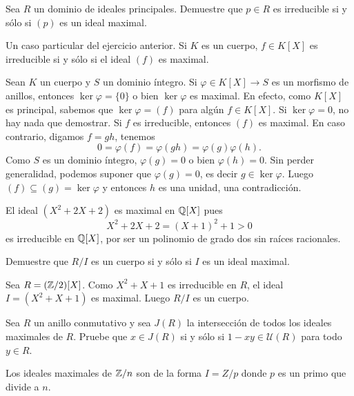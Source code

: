 \begin{exercise}
Sea $R$ un dominio de ideales principales. Demuestre que $p\in R$ es irreducible si y sólo si $(p)$ es un ideal maximal. 	
\end{exercise}

Un caso particular del ejercicio anterior. Si $K$ es un cuerpo, $f\in K[X]$ es irreducible si y sólo si el
ideal $(f)$ es maximal.  

\begin{example}
Sean $K$ un cuerpo y $S$ un dominio íntegro. Si $\varphi\in K[X]\to S$ es un morfismo de anillos, entonces $\ker \varphi=\{0\}$ o bien $\ker\varphi$ es maximal. En efecto,
como $K[X]$ es principal, sabemos que $\ker\varphi=(f)$ para algún $f\in K[X]$. Si $\ker\varphi=0$, no hay nada que demostrar. 
Si $f$ es irreducible, entonces $(f)$ es maximal. En caso contrario, 
digamos $f=gh$, tenemos 
\[
0=\varphi(f)=\varphi(gh)=\varphi(g)\varphi(h).
\]
Como $S$ es un dominio íntegro, $\varphi(g)=0$ o bien $\varphi(h)=0$. Sin perder generalidad, podemos suponer que $\varphi(g)=0$,
es decir $g\in\ker \varphi$. Luego $(f)\subseteq (g)=\ker\varphi$ y entonces $h$ es una unidad, una contradicción. 
\end{example}

\begin{example}
El ideal $(X^2+2X+2)$ es maximal en $\mathbb{Q}[X]$ pues 
\[
X^2+2X+2=(X+1)^2+1>0
\]
es irreducible en $\mathbb{Q}[X]$, por ser un polinomio de grado dos sin raíces racionales.  	
\end{example}

\begin{exercise}
Demuestre que $R/I$ es un cuerpo si y sólo si $I$ es un ideal maximal.	
\end{exercise}
	
\begin{example}
Sea $R=(\mathbb{Z}/2)[X]$. Como $X^2+X+1$ es irreducible en $R$, el ideal $I=(X^2+X+1)$ es maximal. Luego $R/I$ es un cuerpo.
\end{example}

\begin{exercise}
\label{xca:Jacobson}
Sea $R$ un anillo conmutativo y sea $J(R)$ la intersección de todos
los ideales maximales de $R$. Pruebe que $x\in J(R)$ si y sólo si
$1-xy\in\mathcal{U}(R)$ para todo $y\in R$. 
\end{exercise}

\begin{exercise}
\label{xca:maxZn}
Los ideales maximales de $\mathbb{Z}/n$ son de la forma $I=Z/p$ donde $p$ es un primo que divide a $n$.
\end{exercise}

